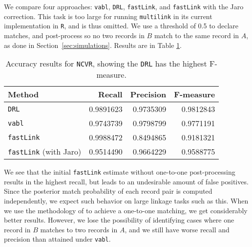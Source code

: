 \documentclass[12pt,letterpaper]{article}
\newcommand{\1}[1]{\mathbb{I}\!\left[#1\right]} %
\begin{document}
We compare four approaches: \texttt{vabl}, \texttt{DRL}, \texttt{fastLink}, and \texttt{fastLink} with the Jaro correction. This task is too large for running \texttt{multilink} in its current implementation in \texttt{R}, and is thus omitted. We use a threshold of 0.5 to declare matches, and post-process so no two records in $B$ match to the same record in $A$, as done in Section~\ref{sec:simulations}. Results are in Table \ref{table:ncvr_results}.

\begin{table}[t]
	\centering
	\begin{tabular}{l|rrr}
		Method & Recall & Precision & F-measure\\
		\hline
		\texttt{DRL} & 0.9891623 & 0.9735309 & 0.9812843\\
		\hline
		\texttt{vabl} & 0.9743739 & 0.9798799 & 0.9771191\\
		\hline
		\texttt{fastLink} & 0.9988472 & 0.8494865 & 0.9181321\\
		\hline
		\texttt{fastLink} (with Jaro) & 0.9514490 & 0.9664229 & 0.9588775\\
	\end{tabular}
	\caption{Accuracy results for \texttt{NCVR}, showing the \texttt{DRL} has the highest F-measure.}
	\label{table:ncvr_results}
\end{table}

We see that the initial \texttt{fastLink} estimate without one-to-one post-processing results in the highest recall, but leads to an undesirable amount of false positives. Since the posterior match probability of each record pair is computed independently, we expect such behavior on large linkage tasks such as this. When we use the methodology of \cite{jaro_1989} to achieve a one-to-one matching, we get considerably better results. However, we lose the possibility of identifying cases where one record in $B$ matches to two records in $A$, and we still have worse recall and precision than attained under \texttt{vabl}. 
\end{document}
